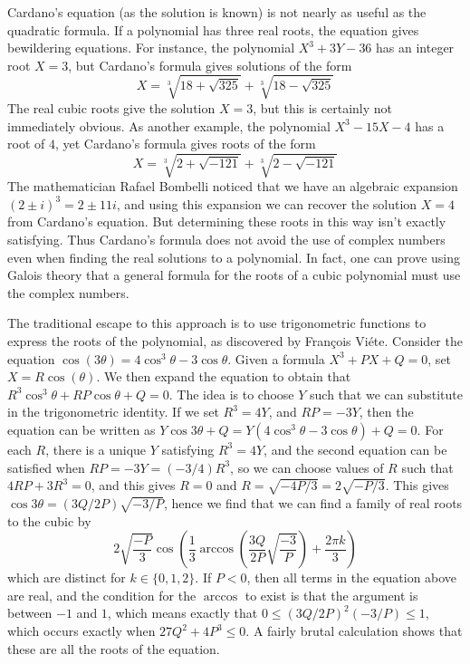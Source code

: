 Cardano's equation (as the solution is known) is not nearly as useful as the quadratic formula. If a polynomial has three real roots, the equation gives bewildering equations. For instance, the polynomial $X^3 + 3Y - 36$ has an integer root $X = 3$, but Cardano's formula gives solutions of the form
%
\[ X = \sqrt[3]{18 + \sqrt{325}} + \sqrt[3]{18 - \sqrt{325}} \]
%
The real cubic roots give the solution $X = 3$, but this is certainly not immediately obvious. As another example, the polynomial $X^3 - 15X - 4$ has a root of $4$, yet Cardano's formula gives roots of the form
%
\[ X = \sqrt[3]{2 + \sqrt{-121}} + \sqrt[3]{2 - \sqrt{-121}} \]
%
The mathematician Rafael Bombelli noticed that we have an algebraic expansion $(2 \pm i)^3 = 2 \pm 11 i$, and using this expansion we can recover the solution $X = 4$ from Cardano's equation. But determining these roots in this way isn't exactly satisfying. Thus Cardano's formula does not avoid the use of complex numbers even when finding the real solutions to a polynomial. In fact, one can prove using Galois theory that a general formula for the roots of a cubic polynomial must use the complex numbers.

The traditional escape to this approach is to use trigonometric functions to express the roots of the polynomial, as discovered by Fran\c{c}ois Vi\'{e}te. Consider the equation $\cos(3 \theta) = 4 \cos^3 \theta - 3 \cos \theta$. Given a formula $X^3 + PX + Q = 0$, set $X = R \cos(\theta)$. We then expand the equation to obtain that $R^3 \cos^3 \theta + R P \cos \theta + Q = 0$. The idea is to choose $Y$ such that we can substitute in the trigonometric identity. If we set $R^3 = 4Y$, and $RP = -3Y$, then the equation can be written as $Y \cos 3 \theta + Q = Y(4 \cos^3 \theta - 3 \cos \theta) + Q = 0$. For each $R$, there is a unique $Y$ satisfying $R^3 = 4Y$, and the second equation can be satisfied when $RP = -3Y = (-3/4)R^3$, so we can choose values of $R$ such that $4RP + 3R^3 = 0$, and this gives $R = 0$ and $R = \sqrt{-4P/3} = 2\sqrt{-P/3}$. This gives $\cos 3 \theta = (3Q/2P) \sqrt{-3/P}$, hence we find that we can find a family of real roots to the cubic by
%
\[ 2 \sqrt{\frac{-P}{3}} \cos \left( \frac{1}{3} \arccos \left( \frac{3Q}{2P} \sqrt{\frac{-3}{P}} \right) + \frac{2 \pi k}{3} \right) \]
%
which are distinct for $k \in \{ 0, 1, 2 \}$. If $P < 0$, then all terms in the equation above are real, and the condition for the $\arccos$ to exist is that the argument is between $-1$ and $1$, which means exactly that $0 \leq (3Q/2P)^2 (-3/P) \leq 1$, which occurs exactly when $27Q^2 + 4P^3 \leq 0$. A fairly brutal calculation shows that these are all the roots of the equation.

